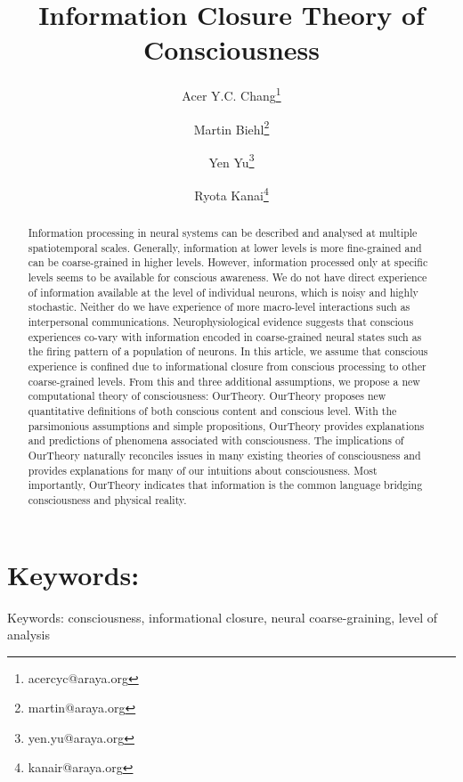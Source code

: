 \documentclass[utf8]{article}
\title{Information Closure Theory of Consciousness}
\author[]{Acer Y.C. Chang\thanks{acercyc@araya.org}}
\author[]{Martin Biehl\thanks{martin@araya.org}}
\author[]{Yen Yu\thanks{yen.yu@araya.org}}
\author[]{Ryota Kanai\thanks{kanair@araya.org }}
\affil[]{ARAYA, Inc., Tokyo, Japan}
\begin{document}
    \linenumbers
	\maketitle
	\tableofcontents


	\begin{abstract}
		Information processing in neural systems can be described and analysed at multiple spatiotemporal scales. Generally, information at lower levels is more fine-grained and can be coarse-grained in higher levels. However, information processed only at specific levels seems to be available for conscious awareness. We do not have direct experience of information available at the level of individual neurons, which is noisy and highly stochastic. Neither do we have experience of more macro-level interactions such as interpersonal communications. Neurophysiological evidence suggests that conscious experiences co-vary with information encoded in coarse-grained neural states such as the firing pattern of a population of neurons. In this article, we assume that conscious experience is confined due to informational closure from conscious processing to other coarse-grained levels. From this and three additional assumptions, we propose a new computational theory of consciousness: \ac{OurTheory}. \ac{OurTheory} proposes new quantitative definitions of both conscious content and conscious level. With the parsimonious assumptions and simple propositions, \ac{OurTheory} provides explanations and predictions of phenomena associated with consciousness. The implications of \ac{OurTheory} naturally reconciles issues in many existing theories of consciousness and provides explanations for many of our intuitions about consciousness. Most importantly, \ac{OurTheory} indicates that information is the common language bridging consciousness and physical reality. 

		
	\end{abstract}


	\section*{Keywords:}
	Keywords: consciousness, informational closure, neural coarse-graining, level of analysis

            
            
    
\end{document}

